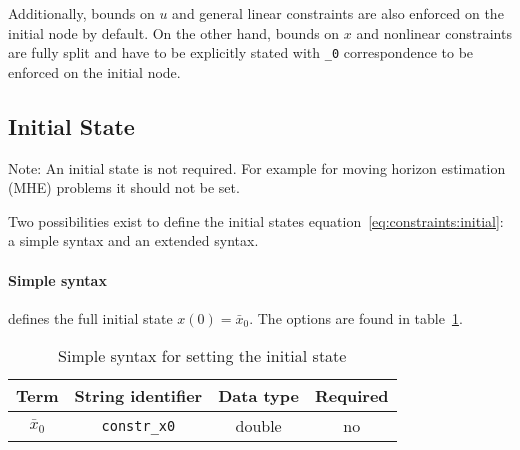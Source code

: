 \documentclass[english]{article}
\newcommand{\code}[1]{\texttt{#1}}
\newcommand{\str}[1]{\texttt{'#1'}}
\newcommand{\optional}{no}
\begin{document}
Additionally, bounds on $u$ and general linear constraints are also enforced on the initial node by default. On the other hand, bounds on $x$ and nonlinear constraints are fully split and have to be explicitly stated with \code{\_0} correspondence to be enforced on the initial node.

%
\subsection{Initial State}\label{sec:constraints:initial}
%
Note: An initial state is not required.
For example for moving horizon estimation (MHE) problems it should not be set.

Two possibilities exist to define the initial states equation~\eqref{eq:constraints:initial}: a simple syntax and an extended syntax.

\paragraph{Simple syntax}
defines the full initial state $x(0)=\bar{x}_0$. The options are found in table~\ref{tab:constraints:simplesyntax}.
\begin{table}[ht!]
    \centering
    \caption{Simple syntax for setting the initial state} \label{tab:constraints:simplesyntax}
    \begin{tabular}{cccc}
        \toprule
        Term & String identifier & Data type & Required \\ \midrule
        $ \bar{x}_0 $ & \code{constr\_x0} & double & \optional \\
        \bottomrule
    \end{tabular}
\end{table}
%
\end{document}
